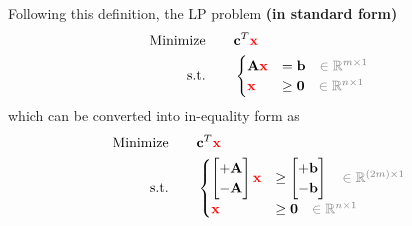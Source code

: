 \documentclass[twocolumn]{ctexart}
\begin{document}
\vspace{40pt}


Following this definition,
the LP problem \textbf{\color{blue} (in standard form)}
\begin{equation}
    \begin{aligned}
        \label{eq:primal_standard}
        \text{Minimize} \qquad &
            \mathbf{c}^T  \mathbf{\color{red} x}
        \\
        \text{s.t.} \qquad &
            \begin{cases}
                \mathbf{A}  \mathbf{\color{red} x}  &  =     \mathbf{b}  {\color{gray} \quad \in \mathbb{R}^{m \times 1}}  \\
                            \mathbf{\color{red} x}  &  \geq  \mathbf{0}  {\color{gray} \quad \in \mathbb{R}^{n \times 1}}  \\
            \end{cases}
    \end{aligned}
\end{equation}
which can be converted into in-equality form as
\begin{equation}
    \begin{aligned}
        \label{eq:primal_standard_converted}
        \text{Minimize} \qquad &
            \mathbf{c}^T  \mathbf{\color{red} x}
        \\
        \text{s.t.} \qquad &
            \begin{cases}
                \begin{bmatrix}  +\mathbf{A}  \\  -\mathbf{A} \end{bmatrix}
                \mathbf{\color{red} x}
                &  \geq
                \begin{bmatrix}  +\mathbf{b}  \\  -\mathbf{b} \end{bmatrix}
                {\color{gray} \quad \in \mathbb{R}^{(2m) \times 1}}  \\
                             \mathbf{\color{red} x}  &  \geq   \mathbf{0}  {\color{gray} \quad \in \mathbb{R}^{n \times 1}}  \\
            \end{cases}
    \end{aligned}
\end{equation}
\end{document}

